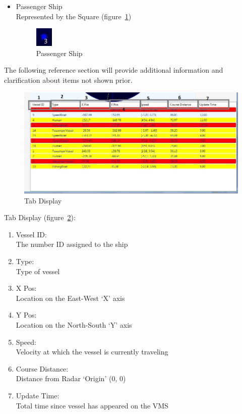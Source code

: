\documentclass[12pt]{article}
\begin{document}
\begin{enumerate} [(a)]
\begin{itemize}
\item Passenger Ship\\
Represented by the Square (figure~\ref{fig:Passenger Ship})
\begin{figure}[h!]
    \centering
    \includegraphics[scale=1]{leg5}
    \caption{Passenger Ship}
    \label{fig:Passenger Ship}
\end{figure}\par
\end{itemize}




The following reference section will provide additional information and clarification about items not shown prior.\par
\begin{figure}[h!]
    \centering
    \includegraphics[scale=1]{ref1}
    \caption{Tab Display}
    \label{fig:Tab Display}
\end{figure}\par

Tab Display (figure~\ref{fig:Tab Display}):
\begin{enumerate}[(1)]
\item Vessel ID:\\
The number ID assigned to the ship
\item Type:\\
Type of vessel
\item X Pos:\\
Location on the East-West ‘X’ axis
\item Y Pos:\\
Location on the North-South ‘Y’ axis
\item Speed:\\
Velocity at which the vessel is currently traveling
\item Course Distance:\\
Distance from Radar ‘Origin’ (0, 0)
\item Update Time:\\
Total time since vessel has appeared on the VMS
\end{enumerate}


\end{enumerate}
\end{document}
